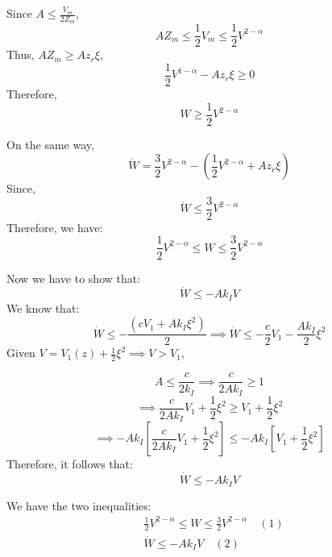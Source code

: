 Since \(A \leq \frac{V_m}{2 Z_m}\),
\begin{equation}
A Z_m \leq \frac{1}{2} V_m \leq \frac{1}{2} V^{2-\alpha}
\end{equation}
Thus, \(A Z_m \geq A z_r \xi\),
\begin{equation}
\frac{1}{2} V^{1-\alpha} - A z_r \xi \geq 0
\end{equation}
Therefore,
\begin{equation}
W \geq \frac{1}{2} V^{2-\alpha}
\end{equation}

On the same way,
\begin{equation}
\dot{W} = \frac{3}{2} V^{2-\alpha} - \left( \frac{1}{2} V^{2-\alpha} + A z_r \xi \right) 
\end{equation}
Since,
\begin{equation}
\dot{W} \leq \frac{3}{2} V^{2-\alpha}
\end{equation}
Therefore, we have:
\begin{equation}
\frac{1}{2} V^{2-\alpha} \leq W \leq \frac{3}{2} V^{2-\alpha}
\end{equation}

Now we have to show that:
\begin{equation}
\dot{W} \leq -A k_I V
\end{equation}
We know that:
\begin{equation}
\dot{W} \leq -\frac{(c V_1 + A k_I \xi^2)}{2} \implies \dot{W} \leq -\frac{c}{2} V_1 - \frac{A k_I}{2} \xi^2
\end{equation}
Given \(V = V_1(z) + \frac{1}{2} \xi^2 \implies V > V_1\),


\begin{equation}
A \leq \frac{c}{2 k_I} \implies \frac{c}{2 A k_I} \geq 1
\end{equation}
\begin{equation}
\implies \frac{c}{2 A k_I} V_1 + \frac{1}{2} \xi^2 \geq V_1 + \frac{1}{2} \xi^2
\end{equation}
\begin{equation}
\implies -A k_I \left[ \frac{c}{2 A k_I} V_1 + \frac{1}{2} \xi^2 \right] \leq -A k_I \left[ V_1 + \frac{1}{2} \xi^2 \right]
\end{equation}
Therefore, it follows that:
\begin{equation}
\dot{W} \leq -A k_I V
\end{equation}


We have the two inequalities:
\begin{align*}
    &\frac{1}{2} V^{2-\alpha} \leq W \leq \frac{3}{2} V^{2-\alpha} \quad (1) \\
    &\dot{W} \leq -A k_I V \quad (2)
\end{align*}

